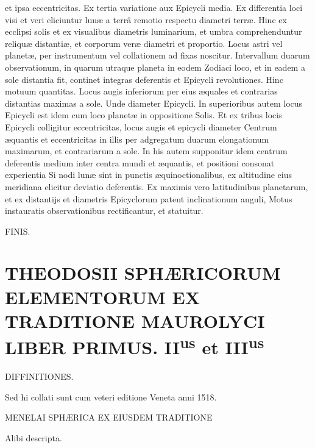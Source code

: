\documentclass[11pt,a4paper]{article}
\begin{document}
et ipsa eccentricitas. Ex tertia variatione aux Epicycli media. Ex differentia loci visi et veri eliciuntur lunæ a terrâ remotio respectu diametri terræ. Hinc ex ecclipsi solis et ex visualibus diametris luminarium, et umbra comprehenduntur reliquæ distantiæ, et corporum veræ diametri et proportio. Locus astri vel planetæ, per instrumentum vel collationem ad fixas noscitur. Intervallum duarum observationum, in quarum utraque planeta in eodem Zodiaci loco, et in eadem a sole distantia fit, continet integras deferentis et Epicycli revolutiones. Hinc motuum quantitas. Locus augis inferiorum per eius æquales et contrarias distantias maximas a sole. Unde diameter Epicycli. In superioribus autem locus Epicycli est idem cum loco planetæ in oppositione Solis. Et ex tribus locis Epicycli colligitur eccentricitas, locus augis et epicycli diameter Centrum æquantis et eccentricitas in illis per adgregatum duarum elongationum maximarum, et contrariarum a sole. In his autem supponitur idem centrum deferentis medium inter centra mundi et æquantis, et positioni consonat experientia Si nodi lunæ sint in punctis æquinoctionalibus, ex altitudine eius meridiana elicitur deviatio deferentis. Ex maximis vero latitudinibus planetarum, et ex distantijs et diametris Epicyclorum patent inclinationum anguli, Motus instauratis observationibus rectificantur, et  statuitur.

FINIS.


\section*{THEODOSII SPHÆRICORUM ELEMENTORUM EX TRADITIONE MAUROLYCI LIBER PRIMUS. II\textsuperscript{us} et III\textsuperscript{us}}

DIFFINITIONES.

Sed hi collati sunt cum veteri editione Veneta anni 1518.

MENELAI SPHÆRICA EX EIUSDEM TRADITIONE

Alibi descripta.
\end{document}
